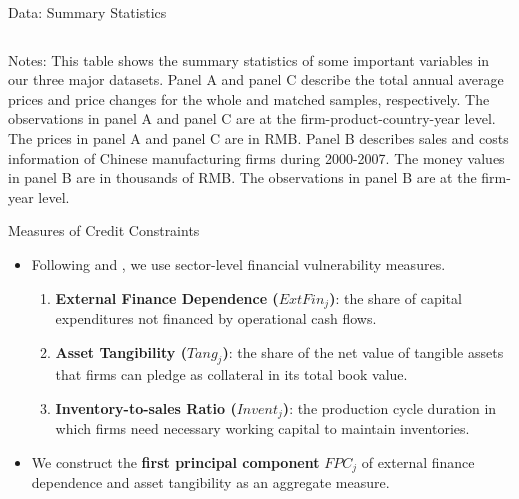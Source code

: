 \documentclass[10pt]{beamer}
\begin{document}
\begin{frame}{Data: Summary Statistics}
\begin{table}[H]
{\begin{threeparttable}
\begin{tabular}{lcccccc}
		\bottomrule
	\end{tabular}
	\begin{tablenotes}
		\footnotesize
		\item Notes: This table shows the summary statistics of some important variables in our three major datasets. Panel A and panel C describe the total annual average prices and price changes for the whole and matched samples, respectively. The observations in panel A and panel C are at the firm-product-country-year level. The prices in panel A and panel C are in RMB. Panel B describes sales and costs information of Chinese manufacturing firms during 2000-2007. The money values in panel B are in thousands of RMB. The observations in panel B are at the firm-year level.
	\end{tablenotes}
	\end{threeparttable}
        }
    \end{table}
\end{frame}

\begin{frame}{Measures of Credit Constraints}
	\begin{itemize}
		\item Following \cite{manova-wei-zhang2015} and \cite{fan-lai-li2015}, we use sector-level financial vulnerability measures.
		\begin{enumerate}
			\item \textbf{External Finance Dependence ($ExtFin_j$)}: the share of capital expenditures not financed by operational cash flows.
			\item \textbf{Asset Tangibility ($Tang_j$)}: the share of the net value of tangible assets that firms can pledge as collateral in its total book value.
			\item \textbf{Inventory-to-sales Ratio ($Invent_j$)}: the production cycle duration in which firms need necessary working capital to maintain inventories.
		\end{enumerate}
		\item We construct the \textbf{first principal component} $FPC_j$ of external finance dependence and asset tangibility as an aggregate measure.
	\end{itemize}
\end{frame}
\end{document}
